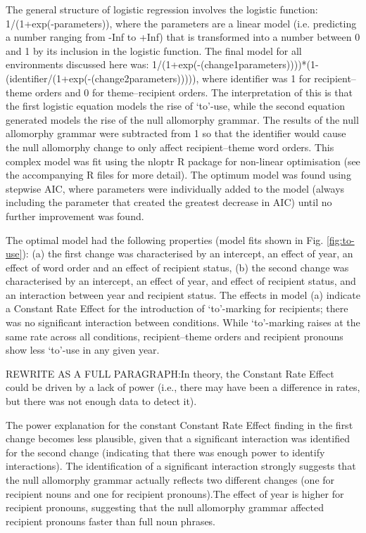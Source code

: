 	The general structure of logistic regression involves the logistic function: 1/(1+exp(-parameters)), where the parameters are a linear model (i.e. predicting a number ranging from -Inf to +Inf) that is transformed into a number between 0 and 1 by its inclusion in the logistic function. The final model for all environments discussed here was: 1/(1+exp(-(change1parameters))))*(1-(identifier/(1+exp(-(change2parameters))))), where identifier was 1 for recipient--theme orders and 0 for theme--recipient orders. The interpretation of this is that the first logistic equation models the rise of `to'-use, while the second equation generated models the rise of the null allomorphy grammar. The results of the null allomorphy grammar were subtracted from 1 so that the identifier would cause the null allomorphy change to only affect recipient--theme word orders. This complex model was fit using the nloptr R package for non-linear optimisation (see the accompanying R files for more detail). The optimum model was found using stepwise AIC, where parameters were individually added to the model (always including the parameter that created the greatest decrease in AIC) until no further improvement was found.

	The optimal model had the following properties (model fits shown in Fig. \ref{fig:to-use}): (a) the first change was characterised by an intercept, an effect of year, an effect of word order and an effect of recipient status, (b) the second change was characterised by an intercept, an effect of year, and effect of recipient status, and an interaction between year and recipient status. The effects in model (a) indicate a Constant Rate Effect for the introduction of `to'-marking for recipients; there was no significant interaction between conditions. While `to'-marking raises at the same rate across all conditions, recipient--theme orders and recipient pronouns show less `to'-use in any given year. 
	
	REWRITE AS A FULL PARAGRAPH:In theory, the Constant Rate Effect could be driven by a lack of power (i.e., there may have been a difference in rates, but there was not enough data to detect it).
	
	
	The power explanation for the constant Constant Rate Effect finding in the first change becomes less plausible, given that a significant interaction was identified for the second change (indicating that there was enough power to identify interactions). The identification of a significant interaction strongly suggests that the null allomorphy grammar actually reflects two different changes (one for recipient nouns and one for recipient pronouns).The effect of year is higher for recipient pronouns, suggesting that the null allomorphy grammar affected recipient pronouns faster than full noun phrases.
	
